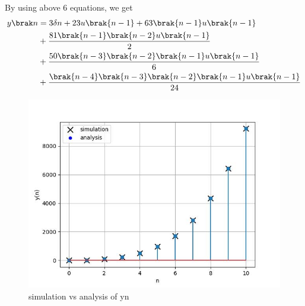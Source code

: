 \documentclass[journal,12pt,twocolumn]{IEEEtran}
\theoremstyle{remark}
\begin{document}
By using above 6 equations, we get
\begin{align}
\notag y\brak n&=3\delta n+23u\brak{n-1}+63\brak{n-1}u\brak{n-1}\\&\notag+\frac{81\brak{n-1}\brak{n-2}u\brak{n-1}}{2}\\&\notag+\frac{50\brak{n-3}\brak{n-2}\brak{n-1}u\brak{n-1}}{6}\\&+\frac{\brak{n-4}\brak{n-3}\brak{n-2}\brak{n-1}u\brak{n-1}}{24}
\end{align}
\begin{figure}
    \centering
    \includegraphics[width=1\columnwidth]{ncert-maths/11/9/4/3/figs/11.9.4.3.1.jpg}
    \caption{simulation vs analysis of y\brak n}
\end{figure}
\end{document}
